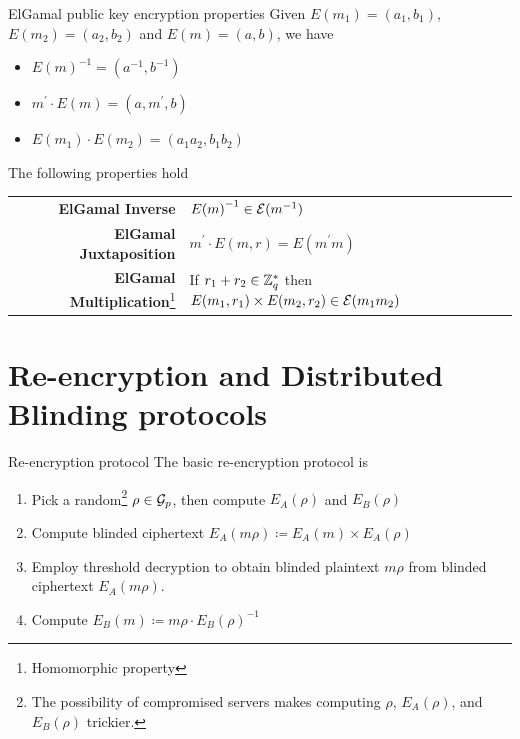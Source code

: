 \documentclass[10pt]{beamer}
\begin{document}
\begin{frame}{ElGamal public key encryption properties}
  Given $E(m_1) = (a_1, b_1)$, $E(m_2) = (a_2, b_2)$ and $E(m) = (a, b)$, we have
  \begin{itemize}
  \item ${E(m)}^{-1} = (a^{-1}, b^{-1})$
  \item $m^{\prime} \cdot E(m) = (a, m^{\prime}, b)$
  \item $E(m_1) \cdot E(m_2) = (a_1 a_2, b_1 b_2)$
  \end{itemize}
  
  The following properties hold
  \begin{center}
    \begin{tabular}{rp{5cm}}
      \textbf{ElGamal Inverse}        & ${E(m)}^{-1} \in {\mathcal{E}}(m^{-1})$ \\
      \textbf{ElGamal Juxtaposition}  & $m^{\prime} \cdot E(m, r) = E(m^{\prime} m)$ \\
      \textbf{ElGamal Multiplication}\footnote{Homomorphic property} & If $r_1 + r_2 \in \mathbb{Z}_q^{\ast}$ then $E(m_1, r_1) \times E(m_2, r_2) \in {\mathcal{E}}(m_1 m_2)$ \\
    \end{tabular}
  \end{center}
\end{frame}


\section{Re-encryption and Distributed Blinding protocols}
\begin{frame}{Re-encryption protocol}
  The basic re-encryption protocol is
  \begin{enumerate}
  \item Pick a random\footnote{The possibility of compromised servers makes computing $\rho$, $E_A(\rho)$, and $E_B(\rho)$ trickier.} $\rho\in{\mathcal{G}}_p$, then compute $E_A(\rho)$ and $E_B(\rho)$
  \item Compute blinded ciphertext $E_A(m\rho) \coloneqq E_A(m) \times E_A(\rho)$
  \item Employ threshold decryption to obtain blinded plaintext $m\rho$ from blinded ciphertext $E_A(m\rho)$.
  \item Compute $E_B(m) \coloneqq m\rho \cdot {E_B(\rho)}^{-1}$
  \end{enumerate}
\end{frame}
\end{document}
